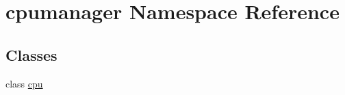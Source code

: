 \hypertarget{namespacecpumanager}{}\section{cpumanager Namespace Reference}
\label{namespacecpumanager}
\subsection*{Classes}
\begin{DoxyCompactItemize}
\item 
class \hyperlink{classcpumanager_1_1cpu}{cpu}
\end{DoxyCompactItemize}
